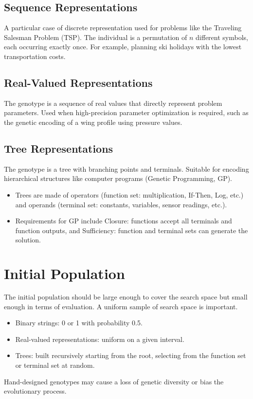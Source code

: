 \subsection*{Sequence Representations}
A particular case of discrete representation used for problems like the Traveling Salesman Problem (TSP).  The individual is a permutation of \(n\) different symbols, each occurring exactly once. For example, planning ski holidays with the lowest transportation costs.

\subsection*{Real-Valued Representations}
The genotype is a sequence of real values that directly represent problem parameters. Used when high-precision parameter optimization is required, such as the genetic encoding of a wing profile using pressure values.

\subsection*{Tree Representations}
The genotype is a tree with branching points and terminals. Suitable for encoding hierarchical structures like computer programs (Genetic Programming, GP).
\begin{itemize}
    \item   Trees are made of operators (function set: multiplication, If-Then, Log, etc.) and operands (terminal set: constants, variables, sensor readings, etc.).
    \item   Requirements for GP include Closure: functions accept all terminals and function outputs, and Sufficiency: function and terminal sets can generate the solution.
\end{itemize}

\section{Initial Population}
The initial population should be large enough to cover the search space but small enough in terms of evaluation. A uniform sample of search space is important.
\begin{itemize}
    \item Binary strings: 0 or 1 with probability 0.5.
    \item Real-valued representations: uniform on a given interval.
    \item Trees: built recursively starting from the root, selecting from the function set or terminal set at random.
\end{itemize}
 Hand-designed genotypes may cause a loss of genetic diversity or bias the evolutionary process.

